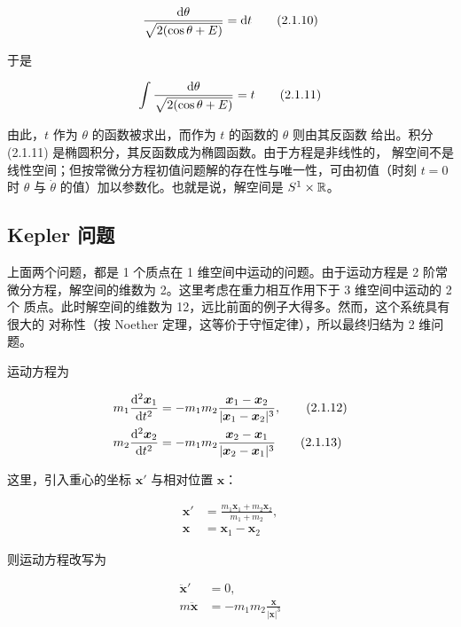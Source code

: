 \begin{equation}
  \frac{\mathrm{d}\theta}{\sqrt{2(\cos\theta + E)}} = \mathrm{d} t
  \tag{2.1.10}
\end{equation}

于是

\begin{equation}
  \int \frac{\mathrm{d}\theta}{\sqrt{2(\cos\theta + E)}} = t
  \tag{2.1.11}
\end{equation}

由此，$t$ 作为 $\theta$ 的函数被求出，而作为 $t$ 的函数的 $\theta$ 则由其反函数
给出。积分 (2.1.11) 是椭圆积分，其反函数成为椭圆函数。由于方程是非线性的，
解空间不是线性空间；但按常微分方程初值问题解的存在性与唯一性，可由初值（时刻
$t = 0$ 时 $\theta$ 与 $\dot\theta$ 的值）加以参数化。也就是说，解空间是
$S^1 \times \mathbb{R}$。

\subsection{Kepler 问题}

上面两个问题，都是 1 个质点在 1 维空间中运动的问题。由于运动方程是 2 阶常
微分方程，解空间的维数为 2。这里考虑在重力相互作用下于 3 维空间中运动的 2 个
质点。此时解空间的维数为 12，远比前面的例子大得多。然而，这个系统具有很大的
对称性（按 Noether 定理，这等价于守恒定律），所以最终归结为 2 维问题。

运动方程为

\begin{align}
  m_1\frac{\mathrm{d}^2\bm{x}_1}{\mathrm{d} t^2} &= -m_1m_2
    \frac{\bm{x}_1 - \bm{x}_2}{|\bm{x}_1 - \bm{x}_2|^3}, \tag{2.1.12}\\
  m_2\frac{\mathrm{d}^2\bm{x}_2}{\mathrm{d} t^2} &= -m_1m_2
    \frac{\bm{x}_2 - \bm{x}_1}{|\bm{x}_2 - \bm{x}_1|^3} \tag{2.1.13}
\end{align}

这里，引入重心的坐标 $\bm{x}'$ 与相对位置 $\bm{x}$：

\begin{align}
  \bm{x}' &= \frac{m_1\bm{x}_1 + m_2\bm{x}_2}{m_1 + m_2}, \tag{2.1.14}\\
  \bm{x} &= \bm{x}_1 - \bm{x}_2 \tag{2.1.15}
\end{align}

则运动方程改写为

\begin{align}
  \ddot{\bm{x}}' &= 0, \tag{2.1.16}\\
  m\ddot{\bm{x}} &= -m_1m_2\frac{\bm{x}}{|\bm{x}|^3} \tag{2.1.17}
\end{align}

